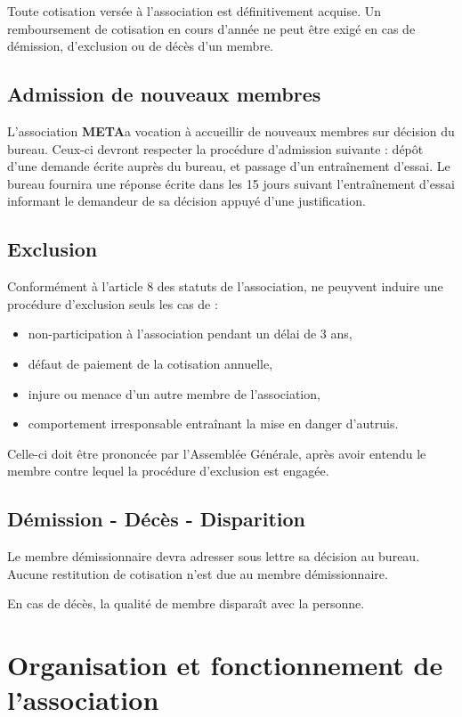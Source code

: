 \documentclass[a4paper,french,10pt]{article}
\newcommand{\meta}{\textbf{META}}
\begin{document}
Toute cotisation versée à l'association est définitivement acquise. Un remboursement de cotisation en cours d'année ne peut être exigé en cas de démission, d'exclusion ou de décès d'un membre.

\subsection{Admission de nouveaux membres}

L'association \meta a vocation à accueillir de nouveaux membres sur décision du bureau. Ceux-ci devront respecter la procédure d'admission suivante : dépôt d'une demande écrite auprès du bureau, et passage d'un entraînement d'essai. Le bureau fournira une réponse écrite dans les 15 jours suivant l'entraînement d'essai informant le demandeur de sa décision appuyé d'une justification.

\subsection{Exclusion}
Conformément à l'article 8 des statuts de l'association, ne peuyvent induire une procédure d'exclusion seuls les cas de :
\begin{itemize}
\item non-participation à l'association pendant un délai de 3 ans,
\item défaut de paiement de la cotisation annuelle,
\item injure ou menace d'un autre membre de l'association,
\item comportement irresponsable entraînant la mise en danger d'autruis.
\end{itemize}

Celle-ci doit être prononcée par l'Assemblée Générale, après avoir entendu le membre contre lequel la procédure d'exclusion est engagée.

\subsection{Démission - Décès - Disparition}
Le membre démissionnaire devra adresser sous lettre sa décision au bureau.
Aucune restitution de cotisation n'est due au membre démissionnaire.

En cas de décès, la qualité de membre disparaît avec la personne.

\section{Organisation et fonctionnement de l'association}
\end{document}
